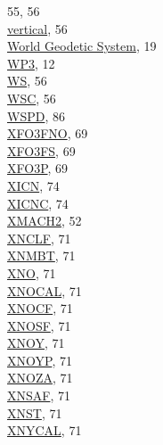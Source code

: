 \documentclass[
]{article}
\begin{document}
55, 56\\
\hspace*{0.333em}\hspace*{0.333em}\href{./4-the-state-of-the-atmosphere.html\#wic}{vertical},
56\\
\href{./3-the-state-of-the-aircraft\#global-positioning-systems}{World
Geodetic System}, 19\\
\href{./3-the-state-of-the-aircraft.html\#wp3}{WP3}, 12\\
\href{./4-the-state-of-the-atmosphere.html\#ws-wd}{WS}, 56\\
\href{./4-the-state-of-the-atmosphere.html\#wsc-wdc}{WSC}, 56\\
\href{./10-obsolete-variables.html\#wspd}{WSPD}, 86\\
\href{./6-air-chemistry-measurements.html\#xf03fs}{XFO3FNO}, 69\\
\href{./6-air-chemistry-measurements.html\#xf03fs}{XFO3FS}, 69\\
\href{./6-air-chemistry-measurements.html\#xf03p}{XFO3P}, 69\\
\href{./7-aerosol-particle-measurements.html\#xicnc}{XICN}, 74\\
\href{./7-aerosol-particle-measurements.html\#xicnc}{XICNC}, 74\\
\href{./4-the-state-of-the-atmosphere.html\#mach-number}{XMACH2}, 52\\
\href{./6-air-chemistry-measurements.html\#no-noy}{XNCLF}, 71\\
\href{./6-air-chemistry-measurements.html\#no-noy}{XNMBT}, 71\\
\href{./6-air-chemistry-measurements.html\#no-noy}{XNO}, 71\\
\href{./6-air-chemistry-measurements.html\#mr-no-no2}{XNOCAL}, 71\\
\href{./6-air-chemistry-measurements.html\#no-noy}{XNOCF}, 71\\
\href{./6-air-chemistry-measurements.html\#no-noy}{XNOSF}, 71\\
\href{./6-air-chemistry-measurements.html\#no-noy}{XNOY}, 71\\
\href{./6-air-chemistry-measurements.html\#no-noy}{XNOYP}, 71\\
\href{./6-air-chemistry-measurements.html\#no-noy}{XNOZA}, 71\\
\href{./6-air-chemistry-measurements.html\#no-noy}{XNSAF}, 71\\
\href{./6-air-chemistry-measurements.html\#no-noy}{XNST}, 71\\
\href{./6-air-chemistry-measurements.html\#mr-no-no2}{XNYCAL}, 71\\
\end{document}
